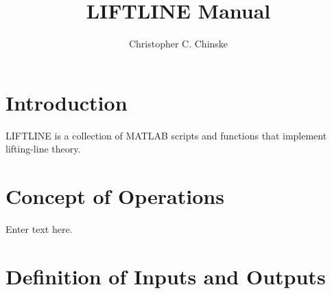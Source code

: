 \documentclass{article}
\title{LIFTLINE Manual}
\author{Christopher C. Chinske}
\begin{document}
\maketitle
\newpage
\section{Introduction}
LIFTLINE is a collection of MATLAB scripts and functions that
implement lifting-line theory.
\section{Concept of Operations}
Enter text here.
\section{Definition of Inputs and Outputs}
\end{document}
